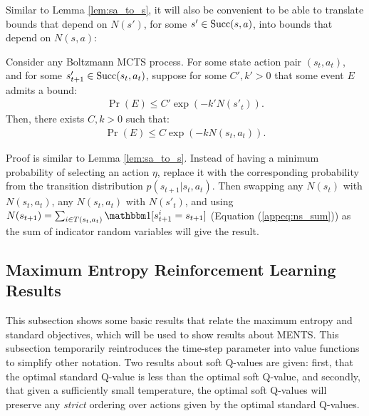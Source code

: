             Similar to Lemma \ref{lem:sa_to_s}, it will also be convenient to be able to translate bounds that depend on $N(s')$, for some $s'\in{\textnormal{Succ}(s,a)}$, into bounds that depend on $N(s,a)$:
            \begin{lemma} \label{lem:s_to_sa}
                Consider any Boltzmann MCTS process. For some state action pair $(s_t,a_t)$, and for some $s'_{t+1}\in{\textnormal{Succ}(s_t,a_t)}$, suppose for some $C',k'>0$ that some event $E$ admits a bound:
                \begin{align}
                    \Pr(E) \leq C'\exp(-k'N(s'_t)).
                \end{align}
                Then, there exists $C,k>0$ such that:
                \begin{align}
                    \Pr(E) \leq C\exp(-k N(s_t,a_t)).
                \end{align}
            \end{lemma}
            \begin{proofoutline}
                Proof is similar to Lemma \ref{lem:sa_to_s}. Instead of having a minimum probability of selecting an action $\eta$, replace it with the corresponding probability from the transition distribution $p(s_{t+1}|s_t,a_t)$. Then swapping any $N(s_t)$ with $N(s_t,a_t)$, any $N(s_t,a_t)$ with $N(s'_t)$, and using $N(s_{t+1}) = \sum_{i\in T(s_t,a_t)} \one[s^i_{t+1} = s_{t+1}]$ (Equation (\ref{appeq:ns_sum})) as the sum of indicator random variables will give the result.
            \end{proofoutline}

    













    \subsection{Maximum Entropy Reinforcement Learning Results} 
    \label{appsec:max_entropy_results}

    
    
        This subsection shows some basic results that relate the maximum entropy and standard objectives, which will be used to show results about MENTS. This subsection temporarily reintroduces the time-step parameter into value functions to simplify other notation. Two results about soft Q-values are given: first, that the optimal standard Q-value is less than the optimal soft Q-value, and secondly, that given a sufficiently small temperature, the optimal soft Q-values will preserve any \textit{strict} ordering over actions given by the optimal standard Q-values. 
    
